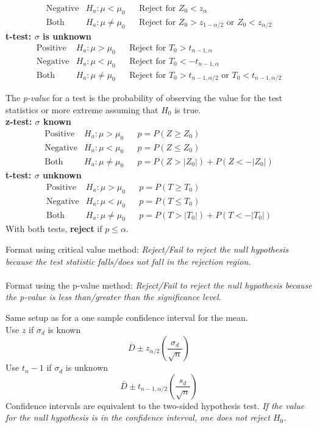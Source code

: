 \documentclass[]{article}
\newenvironment{definitions}{
	\begin{description}[font=\sffamily\bfseries, leftmargin=1cm, style=nextline]
	}{
	\end{description}
}
\begin{document}
\begin{definitions}
\[\begin{array}{llcl}
		\text{Negative} & H_a: \mu < \mu_0 && \text{Reject for } Z_0 < z_{\alpha}\\
		\text{Both} & H_a: \mu \neq \mu_0 && \text{Reject for } Z_0 > z_{1 - \alpha/2} \text{ or } Z_0 < z_{\alpha / 2}
	\end{array}
	\]
	\textbf{t-test: $\sigma$ is unknown}
	\[
	\begin{array}{llcl}
		\text{Positive} & H_a: \mu > \mu_0 && \text{Reject for } T_0 > t_{n-1, \alpha}\\
		\text{Negative} & H_a: \mu < \mu_0 && \text{Reject for } T_0 < -t_{n-1, \alpha}\\
		\text{Both} & H_a: \mu \neq \mu_0 && \text{Reject for } T_0 > t_{n - 1, \alpha/2} \text{ or } T_0 < t_{n - 1, \alpha / 2}
	\end{array}
	\]
	\item[Rejection Criteria -- p-value]
	The \emph{p-value} for a test is the probability of observing the value for the test statistics or more extreme assuming that $H_0$ is true.\\
	\textbf{z-test: $\sigma$ known}
	\[
	\begin{array}{llcl}
		\text{Positive} & H_a: \mu > \mu_0 && p = P(Z \geq Z_0)\\
		\text{Negative} & H_a: \mu < \mu_0 && p = P(Z \leq Z_0)\\
		\text{Both} & H_a: \mu \neq \mu_0 && p = P(Z > |Z_0|) + P(Z < -|Z_0|)
	\end{array}
	\]
	\textbf{t-test: $\sigma$ unknown}
	\[
	\begin{array}{llcl}
		\text{Positive} & H_a: \mu > \mu_0 && p = P(T \geq T_0)\\
		\text{Negative} & H_a: \mu < \mu_0 && p = P(T \leq T_0)\\
		\text{Both} & H_a: \mu \neq \mu_0 && p = P(T > |T_0|) + P(T < -|T_0|)
	\end{array}
	\]
	With both tests, \textbf{reject} if $p \leq \alpha$.
	\item[Decision]
	Format using critical value method: \emph{Reject/Fail to reject the null hypothesis because the test statistic falls/does not fall in the rejection region.}\\\\
	Format using the p-value method: \emph{Reject/Fail to reject the null hypothesis because the p-value is less than/greater than the significance level.}
	\item[Confidence intervals for paired data]
	Same setup as for a one sample confidence interval for the mean.\\
	Use $z$ if $\sigma_d$ is known
	\[ \overline{D} \pm z_{\alpha/2}\left(\frac{\sigma_d}{\sqrt{n}}\right) \]
	Use $t_n-1$ if $\sigma_d$ is unknown
	\[ \overline{D} \pm t_{n-1,\alpha/2}\left(\frac{s_d}{\sqrt{n}}\right) \]
	Confidence intervals are equivalent to the two-sided hypothesis test. \emph{If the value for the null hypothesis is in the confidence interval, one does not reject $H_0$.}
\end{definitions}
\end{document}
